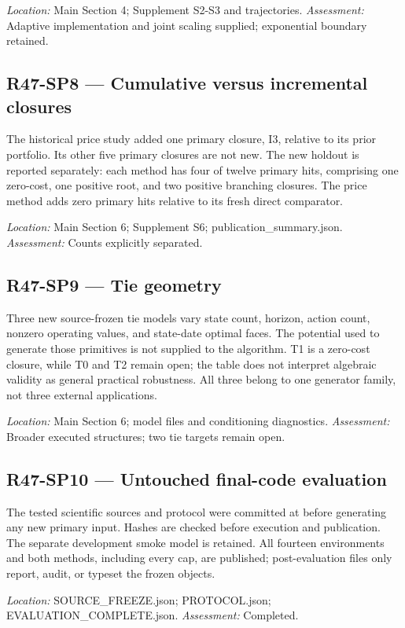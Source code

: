 \noindent\emph{Location:} Main Section 4; Supplement S2-S3 and trajectories. \emph{Assessment:} Adaptive implementation and joint scaling supplied; exponential boundary retained.

\subsection{R47-SP8 --- Cumulative versus incremental closures}
The historical price study added one primary closure, I3, relative to its prior portfolio. Its other five primary closures are not new. The new holdout is reported separately: each method has four of twelve primary hits, comprising one zero-cost, one positive root, and two positive branching closures. The price method adds zero primary hits relative to its fresh direct comparator.

\noindent\emph{Location:} Main Section 6; Supplement S6; publication\_summary.json. \emph{Assessment:} Counts explicitly separated.

\subsection{R47-SP9 --- Tie geometry}
Three new source-frozen tie models vary state count, horizon, action count, nonzero operating values, and state-date optimal faces. The potential used to generate those primitives is not supplied to the algorithm. T1 is a zero-cost closure, while T0 and T2 remain open; the table does not interpret algebraic validity as general practical robustness. All three belong to one generator family, not three external applications.

\noindent\emph{Location:} Main Section 6; model files and conditioning diagnostics. \emph{Assessment:} Broader executed structures; two tie targets remain open.

\subsection{R47-SP10 --- Untouched final-code evaluation}
The tested scientific sources and protocol were committed at  before generating any new primary input. Hashes are checked before execution and publication. The separate development smoke model is retained. All fourteen environments and both methods, including every cap, are published; post-evaluation files only report, audit, or typeset the frozen objects.

\noindent\emph{Location:} SOURCE\_FREEZE.json; PROTOCOL.json; EVALUATION\_COMPLETE.json. \emph{Assessment:} Completed.

